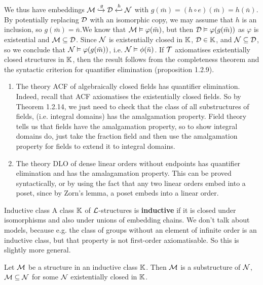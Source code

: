 \documentclass{article}
\numberwithin{thm}{subsection}
\begin{document}
We thus have embeddings $\calM \xhookrightarrow{g} \calD \xhookleftarrow{h} \calN$ with $g(\bar m) = (h \circ e)(\bar m) = h(\bar n).$ By potentially replacing $\mathcal{D}$ with an isomorphic copy, we may assume that $h$ is an inclusion, so $g(\bar m) = \bar n$.\gap We know that $\mathcal{M} \vDash \varphi(\bar m)$, but then $\mathcal{D} \vDash \varphi(g(\bar m))$ as $\varphi$ is existential and $\mathcal{M} \subseteq \mathcal{D}$. Since $\mathcal{N}$ is existentially closed in $\mathbb{K}$, $\mathcal{D} \in \mathbb{K}$, and $\mathcal{N} \subseteq \mathcal{D}$, so we conclude that $\mathcal{N} \vDash \varphi(g(\bar m))$, i.e. $\mathcal{N} \vDash \phi(\bar n)$. If $\mathcal{T}$ axiomatises existentially closed structures in $\mathbb{K}$, then the result follows from the completeness theorem and the syntactic criterion for quantifier elimination (proposition 1.2.9). \endproof
\newlec
\begin{exs}\hspace{0.1cm}
    \begin{enumerate}
        \item The theory ACF of algebraically closed fields has quantifier elimination. Indeed, recall that ACF axiomatises the existentially closed fields. So by Theorem 1.2.14, we just need to check that the class of all substructures of fields, (i.e. integral domains) has the amalgamation property. Field theory tells us that fields have the amalgamation property, so to show integral domains do, just take the fraction field and then use the amalgamation property for fields to extend it to integral domains.
        \item The theory DLO of dense linear orders without endpoints has quantifier elimination and has the amalagamation property. This can be proved syntactically, or by using the fact that any two linear orders embed into a poset, since by Zorn's lemma, a poset embeds into a linear order.
    \end{enumerate}
\end{exs}
\begin{fancydefine}{Inductive class}
    A class $\mathbb{K}$ of $\mathcal{L}$-structures is \textbf{inductive} if it is closed under isomorphisms and also under unions of embedding chains. \gap We don't talk about models, because e.g. the class of groups without an element of infinite order is an inductive class, but that property is not first-order axiomatisable. So this is slightly more general.
\end{fancydefine}
\begin{fancythm}{}
    Let $\mathcal{M}$ be a structure in an inductive class $\mathbb{K}$. Then $\mathcal{M}$ is a substructure of $\mathcal{N}$, $\mathcal{M} \subseteq \mathcal{N}$ for some $\mathcal{N}$ existentially closed in $\mathbb{K}$.
\end{fancythm}
\end{document}
